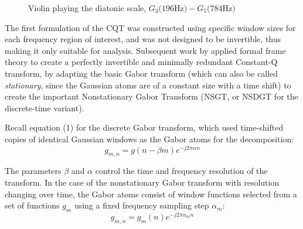 \documentclass[letter,12pt]{article}
\begin{document}
\begin{figure}[ht]
	\centering
	\hspace{0.5em}
	\caption{Violin playing the diatonic scale, $G_{3} \text{(196Hz)} - G_{5} \text{(784Hz)}$\cite{jbrown}}
	\label{fig:violin}
\end{figure}

The first formulation of the CQT was constructed using specific window sizes for each frequency region of interest, and was not designed to be invertible, thus making it only suitable for analysis. Subsequent work by \cite{balazs, jaillet} applied formal frame theory to create a perfectly invertible and minimally redundant Constant-Q transform, by adapting the basic Gabor transform (which can also be called \textit{stationary}, since the Gaussian atoms are of a constant size with a time shift) to create the important Nonstationary Gabor Transform (NSGT, or NSDGT for the discrete-time variant).

Recall equation (1) for the discrete Gabor transform, which used time-shifted copies of identical Gaussian windows as the Gabor atoms for the decomposition:
\[ g_{m,n} = g(n-\beta m)e^{-j2\pi \alpha n} \]

The parameters $\beta$ and $\alpha$ control the time and frequency resolution of the transform. In the case of the nonstationary Gabor transform with resolution changing over time, the Gabor atoms consist of window functions selected from a set of functions $g_{m}$ using a fixed frequency sampling step $\alpha_{m}$:
\[ g_{m,n} = g_{m}(n)e^{-j2\pi \alpha_{m} n} \]
\end{document}
